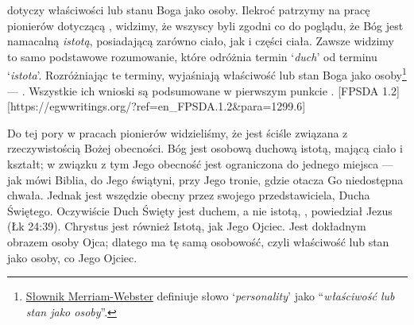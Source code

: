 
 dotyczy właściwości lub stanu Boga jako osoby. Ilekroć patrzymy na pracę pionierów dotyczącą , widzimy, że wszyscy byli zgodni co do poglądu, że Bóg jest namacalną \textit{istotą}, posiadającą zarówno ciało, jak i części ciała. Zawsze widzimy to samo podstawowe rozumowanie, które odróżnia termin ‘\textit{duch}’ od terminu ‘\textit{istota}’. Rozróżniając te terminy, wyjaśniają właściwość lub stan Boga jako osoby\footnote{\href{https://www.merriam-webster.com/dictionary/personality}{Słownik Merriam-Webster} definiuje słowo ‘\textit{personality}’ jako “\textit{właściwość lub stan jako osoby}”.} — . Wszystkie ich wnioski są podsumowane w pierwszym punkcie . [FPSDA 1.2][https://egwwritings.org/?ref=en\_FPSDA.1.2&para=1299.6]

Do tej pory w pracach pionierów widzieliśmy, że  jest ściśle związana z rzeczywistością Bożej obecności. Bóg jest osobową duchową istotą, mającą ciało i kształt; w związku z tym Jego obecność jest ograniczona do jednego miejsca — jak mówi Biblia, do Jego świątyni, przy Jego tronie, gdzie otacza Go niedostępna chwała. Jednak jest wszędzie obecny przez swojego przedstawiciela, Ducha Świętego. Oczywiście Duch Święty jest duchem, a nie istotą, , powiedział Jezus (Łk 24:39). Chrystus jest również Istotą, jak Jego Ojciec. Jest dokładnym obrazem osoby Ojca; dlatego ma tę samą osobowość, czyli właściwość lub stan jako osoby, co Jego Ojciec.

